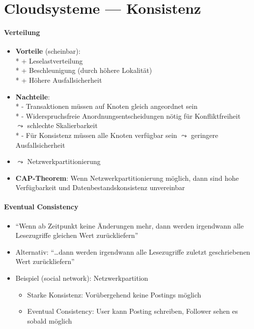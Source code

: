 \section{Cloudsysteme --- Konsistenz}
\label{sec:cloudkonsistenz}

\paragraph{Verteilung}
\begin{itemize}
	\item \textbf{Vorteile} (scheinbar): \\*
		+ Leselastverteilung \\*
		+ Beschleunigung (durch höhere Lokalität) \\*
		+ Höhere Ausfallsicherheit
	\item \textbf{Nachteile}: \\*
		- Transaktionen müssen auf Knoten gleich angeordnet sein \\*
		- Widerspruchsfreie Anordnungsentscheidungen nötig für Konfliktfreiheit \( \leadsto \) schlechte Skalierbarkeit \\*
		- Für Konsistenz müssen alle Knoten verfügbar sein \( \leadsto \) geringere Ausfallsicherheit
	\item \( \leadsto \) Netzwerkpartitionierung
	\item \textbf{CAP-Theorem}: Wenn Netzwerkpartitionierung möglich, dann sind hohe Verfügbarkeit und Datenbestandskonsistenz unvereinbar
\end{itemize}

\paragraph{Eventual Consistency}
\begin{itemize}
	\item ``Wenn ab Zeitpunkt keine Änderungen mehr, dann werden irgendwann alle Lesezugriffe gleichen Wert zurückliefern''
	\item Alternativ: ``\dots dann werden irgendwann alle Lesezugriffe zuletzt geschriebenen Wert zurückliefern''
	\item Beispiel (social network): Netzwerkpartition
	\begin{itemize}
		\item Starke Konsistenz: Vorübergehend keine Postings möglich
		\item Eventual Consistency: User kann Posting schreiben, Follower sehen es sobald möglich
	\end{itemize}
\end{itemize}

